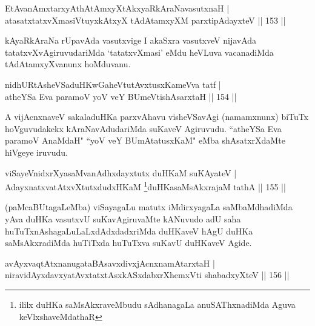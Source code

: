 
\begin{shl}
EtAvanAmxtarxyAthAtAmxyXtAkxyaRkAraNavasutxnaH |\\
atasatxtatxvXmasiVtuyxkAtxyX tAdAtamxyXM parxtipAdayxteV \hfill || 153 ||
\end{shl}

\begin{artha}
kAyaRkAraNa rUpavAda vasutxvige I akaSxra vasutxveV nijavAda tatatxvXvAgiruvudariMda `tatatxvXmasi' eMdu heVLuva vacanadiMda tAdAtamxyXvanunx hoMduvanu.
\end{artha}


\begin{shl}
nidhURtAsheVSaduHKwGaheVtutAvxtusxKameVva tatf |\\
atheYSa Eva paramoV yoV veY BUmeVtishAsarxtaH \hfill || 154 ||
\end{shl}

\begin{artha}
A vijAcnxnaveV sakaladuHKa parxvAhavu visheVSavAgi (namamxnunx) biTuTx hoVguvudakekx kAraNavAdudariMda suKaveV Agiruvudu. ``atheYSa Eva paramoV AnaMdaH" ``yoV veY BUmAtatusxKaM" eMba shAsatxrXdaMte hiVgeye iruvudu.
\end{artha}


\begin{shl}
viSayeVnidxrXyasaMvanAdhxdayxtutx duHKaM suKAyateV |\\
AdayxnatxvatAtxvXtutxdudxHKaM \footnote{ililx duHKa saMsAkxraveMbudu sAdhanagaLa anuSAThxnadiMda Aguva keVlxshaveMdathaR}duHKasaMsAkxrajaM tathA \hfill || 155 ||
\end{shl}

\begin{artha}
(paMcaBUtagaLeMba) viSayagaLu matutx iMdirxyagaLa saMbaMdhadiMda yAva duHKa vasutxvU suKavAgiruvaMte kANuvudo adU saha huTuTxnAshagaLuLaLxdAdxdadxriMda duHKaveV hAgU duHKa saMsAkxradiMda huTiTxda huTuTxva suKavU duHKaveV Agide.
\end{artha}

\begin{shl}
avAyxvaqtAtxnanugataBAsavxdivxjAcnxnamAtarxtaH |\\
niravidAyxdavxyatAvxtatxtAsxkASxdabxrXhemxVti shabadxyXteV \hfill || 156 ||
\end{shl}

